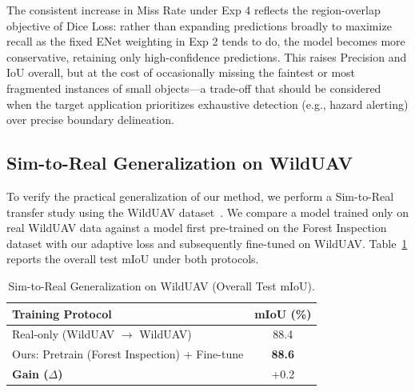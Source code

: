 \documentclass[journal,compsoc]{IEEEtran}
\begin{document}
The consistent increase in Miss Rate under Exp 4 reflects the region-overlap objective of Dice Loss: rather than expanding predictions broadly to maximize recall as the fixed ENet weighting in Exp 2 tends to do, the model becomes more conservative, retaining only high-confidence predictions. This raises Precision and IoU overall, but at the cost of occasionally missing the faintest or most fragmented instances of small objects---a trade-off that should be considered when the target application prioritizes exhaustive detection (e.g., hazard alerting) over precise boundary delineation.

\subsection{Sim-to-Real Generalization on WildUAV}
To verify the practical generalization of our method, we perform a Sim-to-Real transfer study using the WildUAV dataset~\cite{florea2021wilduav}. We compare a model trained only on real WildUAV data against a model first pre-trained on the Forest Inspection dataset with our adaptive loss and subsequently fine-tuned on WildUAV. Table~\ref{tab:wilduav_transfer} reports the overall test mIoU under both protocols.

\begin{table}[h]
\centering
\caption{Sim-to-Real Generalization on WildUAV (Overall Test mIoU).}
\label{tab:wilduav_transfer}
\small
\begin{tabular}{lc}
\toprule
\textbf{Training Protocol} & \textbf{mIoU (\%)} \\
\midrule
Real-only (WildUAV $\rightarrow$ WildUAV) & 88.4 \\
Ours: Pretrain (Forest Inspection) + Fine-tune & \textbf{88.6} \\
\midrule
\textbf{Gain ($\Delta$)} & +0.2 \\
\bottomrule
\end{tabular}
\end{table}
\end{document}
